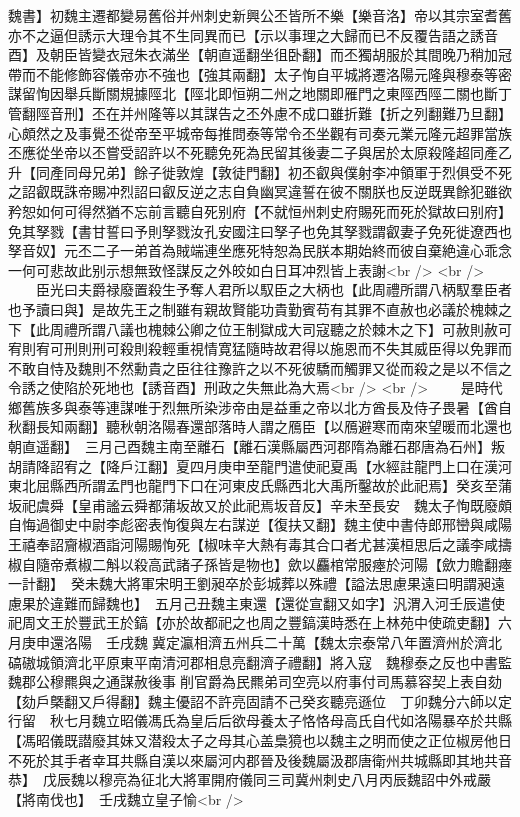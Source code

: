 魏書】初魏主遷都變易舊俗并州刺史新興公丕皆所不樂【樂音洛】帝以其宗室耆舊亦不之逼但誘示大理令其不生同異而已【示以事理之大歸而已不反覆告語之誘音酉】及朝臣皆變衣冠朱衣滿坐【朝直遥翻坐徂卧翻】而丕獨胡服於其間晚乃稍加冠帶而不能修飾容儀帝亦不強也【強其兩翻】太子恂自平城將遷洛陽元隆與穆泰等密謀留恂因舉兵斷關規據陘北【陘北即恒朔二州之地關即雁門之東陘西陘二關也斷丁管翻陘音刑】丕在并州隆等以其謀告之丕外慮不成口雖折難【折之列翻難乃旦翻】心頗然之及事覺丕從帝至平城帝每推問泰等常令丕坐觀有司奏元業元隆元超罪當族丕應從坐帝以丕嘗受詔許以不死聽免死為民留其後妻二子與居於太原殺隆超同產乙升【同產同母兄弟】餘子徙敦煌【敦徒門翻】初丕叡與僕射李冲領軍于烈俱受不死之詔叡既誅帝賜冲烈詔曰叡反逆之志自負幽冥違誓在彼不關朕也反逆既異餘犯雖欲矜恕如何可得然猶不忘前言聽自死别府【不就恒州刺史府賜死而死於獄故曰别府】免其孥戮【書甘誓曰予則孥戮汝孔安國注曰孥子也免其孥戮謂叡妻子免死徙遼西也孥音奴】元丕二子一弟首為賊端連坐應死特恕為民朕本期始終而彼自棄絶違心乖念一何可悲故此别示想無致怪謀反之外皎如白日耳冲烈皆上表謝<br />
<br />
　　臣光曰夫爵禄廢置殺生予奪人君所以馭臣之大柄也【此周禮所謂八柄馭羣臣者也予讀曰與】是故先王之制雖有親故賢能功貴勤賓苟有其罪不直赦也必議於槐棘之下【此周禮所謂八議也槐棘公卿之位王制獄成大司寇聽之於棘木之下】可赦則赦可宥則宥可刑則刑可殺則殺輕重視情寛猛隨時故君得以施恩而不失其威臣得以免罪而不敢自恃及魏則不然勳貴之臣往往豫許之以不死彼驕而觸罪又從而殺之是以不信之令誘之使陷於死地也【誘音酉】刑政之失無此為大焉<br />
<br />
　　是時代鄉舊族多與泰等連謀唯于烈無所染涉帝由是益重之帝以北方酋長及侍子畏暑【酋自秋翻長知兩翻】聽秋朝洛陽春還部落時人謂之鴈臣【以鴈避寒而南來望暖而北還也朝直遥翻】　三月己酉魏主南至離石【離石漢縣屬西河郡隋為離石郡唐為石州】叛胡請降詔宥之【降戶江翻】夏四月庚申至龍門遣使祀夏禹【水經註龍門上口在漢河東北屈縣西所謂孟門也龍門下口在河東皮氏縣西北大禹所鑿故於此祀焉】癸亥至蒲坂祀虞舜【皇甫謐云舜都蒲坂故又於此祀焉坂音反】辛未至長安　魏太子恂既廢頗自悔過御史中尉李彪密表恂復與左右謀逆【復扶又翻】魏主使中書侍郎邢巒與咸陽王禧奉詔齎椒酒詣河陽賜恂死【椒味辛大熱有毒其合口者尤甚漢桓思后之議李咸擣椒自隨帝煮椒二斛以殺高武諸子孫皆是物也】歛以麤棺常服瘞於河陽【歛力贍翻瘞一計翻】　癸未魏大將軍宋明王劉昶卒於彭城葬以殊禮【謚法思慮果遠曰明謂昶遠慮果於違難而歸魏也】　五月己丑魏主東還【還從宣翻又如字】汎渭入河壬辰遣使祀周文王於豐武王於鎬【亦於故都祀之也周之豐鎬漢時悉在上林苑中使疏吏翻】六月庚申還洛陽　壬戌魏冀定瀛相濟五州兵二十萬【魏太宗泰常八年置濟州於濟北碻磝城領濟北平原東平南清河郡相息亮翻濟子禮翻】將入寇　魏穆泰之反也中書監魏郡公穆羆與之通謀赦後事削官爵為民羆弟司空亮以府事付司馬慕容契上表自劾【劾戶槩翻又戶得翻】魏主優詔不許亮固請不己癸亥聽亮遜位　丁卯魏分六師以定行留　秋七月魏立昭儀馮氏為皇后后欲母養太子恪恪母高氏自代如洛陽暴卒於共縣【馮昭儀既譛廢其妹又潜殺太子之母其心盖梟獍也以魏主之明而使之正位椒房他日不死於其手者幸耳共縣自漢以來屬河内郡晉及後魏屬汲郡唐衛州共城縣即其地共音恭】　戊辰魏以穆亮為征北大將軍開府儀同三司冀州刺史八月丙辰魏詔中外戒嚴【將南伐也】　壬戌魏立皇子愉<br />
